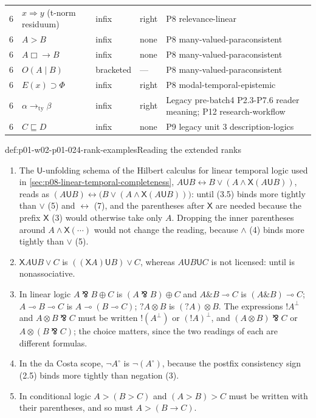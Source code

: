 \begin{longtable}{@{}p{}p{}p{}p{}p{}@{}}
6 & \(x\Rightarrow y\) (t-norm residuum) & infix & right & P8 relevance-linear \\
6 & \(A>B\) & infix & none & P8 many-valued-paraconsistent \\
6 & \(A\Box\!\!\to B\) & infix & none & P8 many-valued-paraconsistent \\
6 & \(O(A\mid B)\) & bracketed & --- & P8 many-valued-paraconsistent \\
6 & \(E(x)\supset\Phi\) & infix & right & P8 modal-temporal-epistemic \\
6 & \(\alpha\to_{\mathrm{ty}}\beta\) & infix & right & Legacy pre-batch4 P2.3-P7.6 reader meaning; P12 research-workflow \\
6 & \(C\sqsubseteq D\) & infix & none & P9 legacy unit 3 description-logics \\
\end{longtable}
\endgroup

\begin{hbexample}{def:p01-w02-p01-024-rank-examples}{Reading the extended ranks}
\begin{enumerate}
\item The \(\mathsf U\)-unfolding schema of the Hilbert calculus for linear
  temporal logic used in \cref{sec:p08-linear-temporal-completeness},
  \(A\mathbin{\mathsf U}B\leftrightarrow B\lor(A\land\mathsf X(A\mathbin{\mathsf U}B))\),
  reads as
  \((A\mathbin{\mathsf U}B)\leftrightarrow\bigl(B\lor(A\land\mathsf X(A\mathbin{\mathsf U}B))\bigr)\):
  until (3.5) binds more tightly than \(\lor\) (5) and \(\leftrightarrow\)
  (7), and the parentheses after \(\mathsf X\) are needed because the prefix
  \(\mathsf X\) (3) would otherwise take only \(A\).  Dropping the inner
  parentheses around \(A\land\mathsf X(\cdots)\) would not change the
  reading, because \(\land\) (4) binds more tightly than \(\lor\) (5).
\item \(\mathsf X A\mathbin{\mathsf U}B\lor C\) is
  \(((\mathsf X A)\mathbin{\mathsf U}B)\lor C\), whereas
  \(A\mathbin{\mathsf U}B\mathbin{\mathsf U}C\) is not licensed: until is
  nonassociative.
\item In linear logic \(A\bindnasrepma B\oplus C\) is
  \((A\bindnasrepma B)\oplus C\) and \(A\mathbin{\&}B\multimap C\) is
  \((A\mathbin{\&}B)\multimap C\); \(A\multimap B\multimap C\) is
  \(A\multimap(B\multimap C)\); \(?A\otimes B\) is \((?A)\otimes B\).
  The expressions \(!A^\perp\) and \(A\otimes B\bindnasrepma C\) must be
  written \(!(A^\perp)\) or \((!A)^\perp\), and
  \((A\otimes B)\bindnasrepma C\) or \(A\otimes(B\bindnasrepma C)\); the
  choice matters, since the two readings of each are different formulas.
\item In the da Costa scope, \(\neg A^\circ\) is \(\neg(A^\circ)\), because
  the postfix consistency sign (2.5) binds more tightly than negation (3).
\item In conditional logic \(A>(B>C)\) and \((A>B)>C\) must be written
  with their parentheses, and so must \(A>(B\to C)\).
\end{enumerate}
\end{hbexample}


